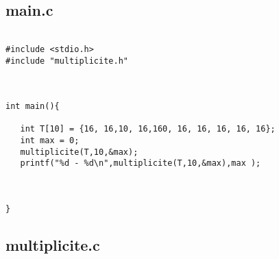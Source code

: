 \documentclass[a4paper, 11pt, oneside]{article}
\begin{document}
\subsection{main.c}
\begin{lstlisting}[caption={Main}]

#include <stdio.h>
#include "multiplicite.h"



int main(){

   int T[10] = {16, 16,10, 16,160, 16, 16, 16, 16, 16};
   int max = 0;
   multiplicite(T,10,&max);
   printf("%d - %d\n",multiplicite(T,10,&max),max );



}

\end{lstlisting}

\subsection{multiplicite.c}
\end{document}
